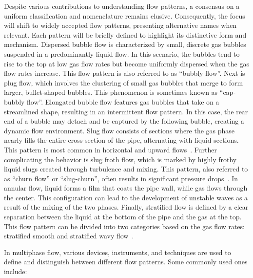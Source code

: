 Despite various contributions to understanding flow patterns, a consensus on a uniform classification and nomenclature remains elusive. Consequently, the focus will shift to widely accepted flow patterns, presenting alternative names when relevant. Each pattern will be briefly defined to highlight its distinctive form and mechanism. Dispersed bubble flow is characterized by small, discrete gas bubbles suspended in a predominantly liquid flow. In this scenario, the bubbles tend to rise to the top at low gas flow rates but become uniformly dispersed when the gas flow rates increase. This flow pattern is also referred to as ``bubbly flow''. Next is plug flow, which involves the clustering of small gas bubbles that merge to form larger, bullet-shaped bubbles. This phenomenon is sometimes known as ``cap-bubbly flow''. Elongated bubble flow features gas bubbles that take on a streamlined shape, resulting in an intermittent flow pattern. In this case, the rear end of a bubble may detach and be captured by the following bubble, creating a dynamic flow environment. Slug flow consists of sections where the gas phase nearly fills the entire cross-section of the pipe, alternating with liquid sections. This pattern is most common in horizontal and upward flows~\cite{soo1990multiphase,kleinstreuer2003two,hewitt1969phase}. Further complicating the behavior is slug froth flow, which is marked by highly frothy liquid slugs created through turbulence and mixing. This pattern, also referred to as ``churn flow'' or ``slug-churn'', often results in significant pressure drops~\cite{soo1990multiphase,kleinstreuer2003two}. In annular flow, liquid forms a film that coats the pipe wall, while gas flows through the center. This configuration can lead to the development of unstable waves as a result of the mixing of the two phases. Finally, stratified flow is defined by a clear separation between the liquid at the bottom of the pipe and the gas at the top. This flow pattern can be divided into two categories based on the gas flow rates: stratified smooth and stratified wavy flow~\cite{al2020bsimplified,al2008development,cheremisinoff1979stratified}.

In multiphase flow, various devices, instruments, and techniques are used to define and distinguish between different flow patterns. Some commonly used ones include:

